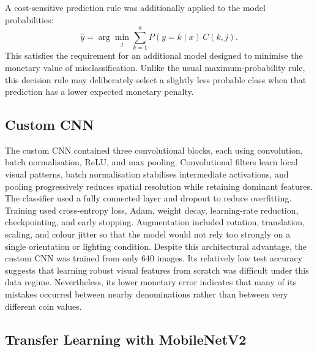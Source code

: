 \documentclass[10pt,a4paper]{article}
\begin{document}
A cost-sensitive prediction rule was additionally applied to the model probabilities:
\begin{equation}
\hat y=\arg\min_j\sum_{k=1}^{8}P(y=k\mid x)\,C(k,j).
\end{equation}
This satisfies the requirement for an additional model designed to minimise the monetary value
of misclassification. Unlike the usual maximum-probability rule, this decision rule may deliberately
select a slightly less probable class when that prediction has a lower expected monetary penalty.

\subsection{Custom CNN}

The custom CNN contained three convolutional blocks, each using convolution, batch normalisation,
ReLU, and max pooling. Convolutional filters learn local visual patterns, batch normalisation
stabilises intermediate activations, and pooling progressively reduces spatial resolution while
retaining dominant features. The classifier used a fully connected layer and dropout to reduce
overfitting. Training used cross-entropy loss, Adam, weight decay, learning-rate reduction,
checkpointing, and early stopping. Augmentation included rotation, translation, scaling, and
colour jitter so that the model would not rely too strongly on a single orientation or lighting
condition. Despite this architectural advantage, the custom CNN was trained from only 640 images.
Its relatively low test accuracy suggests that learning robust visual features from scratch was
difficult under this data regime. Nevertheless, its lower monetary error indicates that many of its
mistakes occurred between nearby denominations rather than between very different coin values.

\subsection{Transfer Learning with MobileNetV2}
\end{document}
